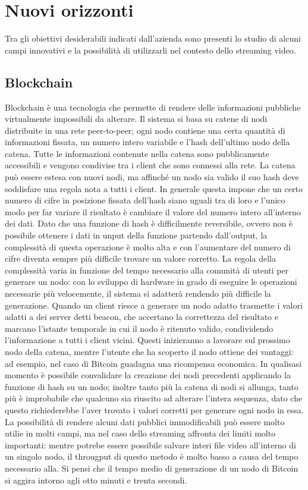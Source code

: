 \section{Nuovi orizzonti}
Tra gli obiettivi desiderabili indicati dall'azienda sono presenti lo studio di alcuni campi innovativi e la possibilità di utilizzarli nel contesto dello streaming video.

	\subsection{Blockchain}
	Blockchain è una tecnologia che permette di rendere delle informazioni pubbliche virtualmente impossibili da alterare. Il sistema si basa su catene di nodi distribuite in una rete peer-to-peer; ogni nodo contiene una certa quantità di informazioni fissata, un numero intero variabile e l'hash dell'ultimo nodo della catena. Tutte le informazioni contenute nella catena sono pubblicamente accessibili e vengono condivise tra i client che sono connessi alla rete. La catena può essere estesa con nuovi nodi, ma affinché un nodo sia valido il suo hash deve soddisfare una regola nota a tutti i client. In generale questa impone che un certo numero di cifre in posizione fissata dell'hash siano uguali tra di loro e l'unico modo per far variare il risultato è cambiare il valore del numero intero all'interno dei dati. Dato che una funzione di hash è difficilmente reversibile, ovvero non è possibile ottenere i dati in unput della funzione partendo dall'output, la complessità di questa operazione è molto alta e con l'aumentare del numero di cifre diventa sempre più difficile trovare un valore corretto. La regola della complessità varia in funzione del tempo necessario alla comunità di utenti per generare un nodo: con lo sviluppo di hardware in grado di eseguire le operazioni necessarie più velocemente, il sistema si adatterà rendendo più difficile la generazione. Quando un client riesce a generare un nodo adatto trasmette i valori adatti a dei server detti beacon, che accertano la correttezza del risultato e marcano l'istante temporale in cui il nodo è ritenuto valido, condividendo l'informazione a tutti i client vicini. Questi inizieranno a lavorare sul prossimo nodo della catena, mentre l'utente che ha scoperto il nodo ottiene dei vantaggi: ad esempio, nel caso di Bitcoin guadagna una ricompensa economica. In qualisasi momento è possibile convalidare la creazione dei nodi precedenti applicando la funzione di hash su un nodo; inoltre tanto più la catena di nodi si allunga, tanto più è improbabile che qualcuno sia riuscito ad alterare l'intera sequenza, dato che questo richiederebbe l'aver trovato i valori corretti per generare ogni nodo in essa.
	\\
	La possibilità di rendere alcuni dati pubblici immodificabili può essere molto utilie in molti campi, ma nel caso dello streaming affronta dei limiti molto importanti: mentre potrebe essere possibile salvare interi file video all'interno di un singolo nodo, il througput di questo metodo è molto basso a causa del tempo necessario alla. Si pensi che il tempo medio di generazione di un nodo di Bitcoin si aggira intorno agli otto minuti e trenta secondi. 


